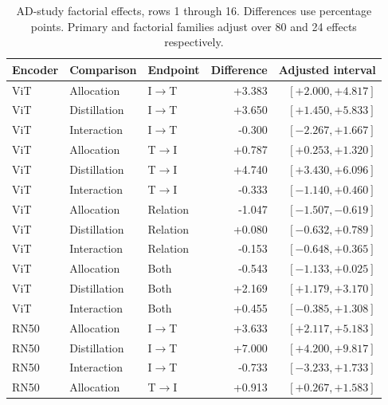 \begin{table}[t]
\centering
\small
\setlength{\tabcolsep}{3pt}
\begin{tabular}{lllrr}
\toprule
Encoder & Comparison & Endpoint & Difference & Adjusted interval\\
\midrule
ViT & Allocation & I$\to$T & +3.383 & $[+2.000,+4.817]$ \\
ViT & Distillation & I$\to$T & +3.650 & $[+1.450,+5.833]$ \\
ViT & Interaction & I$\to$T & -0.300 & $[-2.267,+1.667]$ \\
ViT & Allocation & T$\to$I & +0.787 & $[+0.253,+1.320]$ \\
ViT & Distillation & T$\to$I & +4.740 & $[+3.430,+6.096]$ \\
ViT & Interaction & T$\to$I & -0.333 & $[-1.140,+0.460]$ \\
ViT & Allocation & Relation & -1.047 & $[-1.507,-0.619]$ \\
ViT & Distillation & Relation & +0.080 & $[-0.632,+0.789]$ \\
ViT & Interaction & Relation & -0.153 & $[-0.648,+0.365]$ \\
ViT & Allocation & Both & -0.543 & $[-1.133,+0.025]$ \\
ViT & Distillation & Both & +2.169 & $[+1.179,+3.170]$ \\
ViT & Interaction & Both & +0.455 & $[-0.385,+1.308]$ \\
RN50 & Allocation & I$\to$T & +3.633 & $[+2.117,+5.183]$ \\
RN50 & Distillation & I$\to$T & +7.000 & $[+4.200,+9.817]$ \\
RN50 & Interaction & I$\to$T & -0.733 & $[-3.233,+1.733]$ \\
RN50 & Allocation & T$\to$I & +0.913 & $[+0.267,+1.583]$ \\
\bottomrule
\end{tabular}
\caption{AD-study factorial effects, rows 1 through 16. Differences use percentage points. Primary and factorial families adjust over 80 and 24 effects respectively.}\label{tab:adfactorial0}
\end{table}


